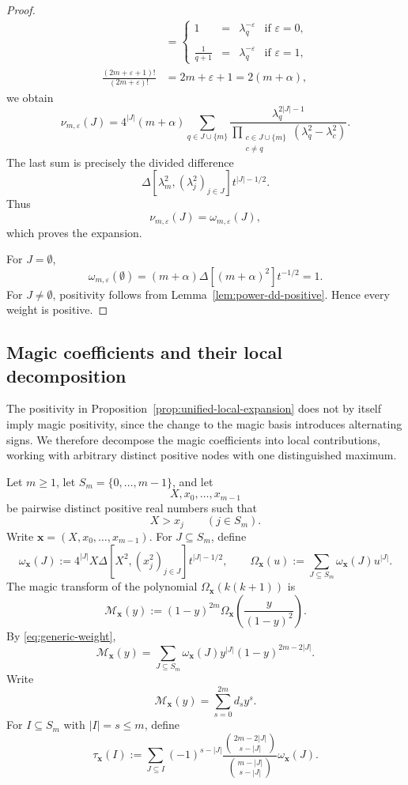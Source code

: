 \documentclass[10pt,a4paper]{amsart}
\theoremstyle{definition}
\newcommand{\DD}{\Delta}
\begin{document}
\begin{proof}
\[\begin{aligned}
&=
\left\{
\begin{array}{cccc}
1 &=&\lambda_q^{-\varepsilon} & \mbox{if } \varepsilon=0,\\
\\
\frac{1}{q+1}&=&\lambda_q^{-\varepsilon}& \mbox{if } \varepsilon=1,
\end{array}
\right.
\\
\frac{(2m+\varepsilon+1)!}{(2m+\varepsilon)!}
&=
2m+\varepsilon+1=
2(m+\alpha),
\end{aligned}
\]
we obtain
\[
\nu_{m,\varepsilon}(J)
=
4^{|J|}(m+\alpha)
\sum_{q\in  J \cup \{m\}}
\frac{\lambda_q^{2|J|-1}}
{\displaystyle
\prod_{\substack{c\in  J \cup \{m\}\\c\ne q}}
(\lambda_q^2-\lambda_c^2)}.
\]
The last sum is precisely the divided difference
\[
\DD[\lambda_m^2,(\lambda_j^2)_{j\in J}]
t^{|J|-1/2}.
\]
Thus
\[
\nu_{m,\varepsilon}(J)=\omega_{m,\varepsilon}(J),
\]
which proves the expansion.

For $J=\emptyset$,
\[
\omega_{m,\varepsilon}(\emptyset)
=
(m+\alpha)\DD[(m+\alpha)^2]t^{-1/2}=1.
\]
For $J\ne\emptyset$, positivity follows from
Lemma~\ref{lem:power-dd-positive}.  Hence every weight is positive.
\end{proof}


\subsection{Magic coefficients and their local decomposition}\label{sec:magic-local}

The positivity in Proposition~\ref{prop:unified-local-expansion}
does not by itself imply magic positivity, since the change to the
magic basis introduces alternating signs.
We therefore decompose the magic coefficients into local contributions,
working with arbitrary distinct positive nodes with one distinguished
maximum.

Let $m\ge1$, let $S_m=\{0,\ldots,m-1\}$, and let
\[
X,x_0,\ldots,x_{m-1}
\]
be pairwise distinct positive real numbers such that
\[
X>x_j
\qquad(j\in S_m).
\]
Write $\mathbf x=(X,x_0,\ldots,x_{m-1})$.
For $J\subseteq S_m$, define
\begin{equation}\label{eq:generic-weight}
\omega_{\mathbf x}(J)
:=
4^{|J|}X
\DD[X^2,(x_j^2)_{j\in J}]t^{|J|-1/2},
\qquad
\Omega_{\mathbf x}(u)
:=
\sum_{J\subseteq S_m}\omega_{\mathbf x}(J)u^{|J|}.
\end{equation}
The magic transform of the polynomial
$\Omega_{\mathbf x}(k(k+1))$ is
\[
\mathcal M_{\mathbf x}(y)
:=
(1-y)^{2m}
\Omega_{\mathbf x}\left(\frac{y}{(1-y)^2}\right).
\]
By \eqref{eq:generic-weight},
\begin{equation}\label{eq:generic-M}
\mathcal M_{\mathbf x}(y)
=
\sum_{J\subseteq S_m}
\omega_{\mathbf x}(J)y^{|J|}(1-y)^{2m-2|J|}.
\end{equation}
Write
\[
\mathcal M_{\mathbf x}(y)
=
\sum_{s=0}^{2m}d_s y^s.
\]
For $I\subseteq S_m$ with $|I|=s\le m$, define
\begin{equation}\label{eq:generic-tau}
\tau_{\mathbf x}(I)
:=
\sum_{J\subseteq I}
(-1)^{s-|J|}
\frac{\binom{2m-2|J|}{s-|J|}}
{\binom{m-|J|}{s-|J|}}
\omega_{\mathbf x}(J).
\end{equation}
\end{document}
